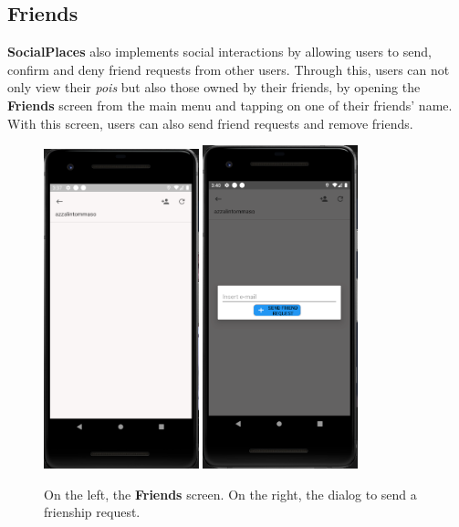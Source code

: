 \documentclass[../../main]{subfiles}
\begin{document}
\subsection{Friends}
\label{ss:final-friends}
\textbf{SocialPlaces} also implements social interactions by allowing users to send, confirm and deny friend requests from other users.
Through this, users can not only view their \textit{pois} but also those owned by their friends, by opening the \textbf{Friends} screen from the main menu and tapping on one of their friends' name.
With this screen, users can also send friend requests and remove friends.
\begin{figure}[H]
    \centering
    \includegraphics[width=0.4\textwidth]{images/app/friend/friend_overwiew}
    \includegraphics[width=0.4\textwidth]{images/app/friend/send_request}
    \caption{On the left, the \textbf{Friends} screen. On the right, the dialog to send a frienship request.}
\end{figure}
\end{document}
